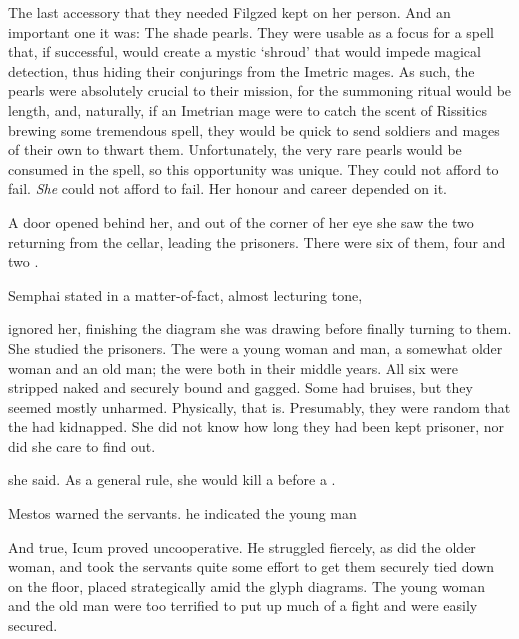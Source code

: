 The last accessory that they needed Filgzed kept on her person. And an important one it was: The shade pearls. They were usable as a focus for a spell that, if successful, would create a mystic `shroud' that would impede magical detection, thus hiding their conjurings from the Imetric mages. As such, the pearls were absolutely crucial to their mission, for the summoning ritual would be length, and, naturally, if an Imetrian mage were to catch the scent of Rissitics brewing some tremendous spell, they would be quick to send soldiers and mages of their own to thwart them. Unfortunately, the very rare pearls would be consumed in the spell, so this opportunity was unique. They could not afford to fail. \emph{She} could not afford to fail. Her honour and career depended on it. 

A door opened behind her, and out of the corner of her eye she saw the two \Gisshorn{} returning from the cellar, leading the prisoners. There were six of them, four \humans{} and two \scathae{}. 

 Semphai stated in a matter-of-fact, almost lecturing tone, 

\Filgzed{} ignored her, finishing the diagram she was drawing before finally turning to them. She studied the prisoners. The \humans{} were a young woman and man, a somewhat older woman and an old man; the \scathae{} were both \daxes{} in their middle years. All six were stripped naked and securely bound and gagged. Some had bruises, but they seemed mostly unharmed. Physically, that is. Presumably, they were random \Cicorans{} that the \Gisshorn{} had kidnapped. She did not know how long they had been kept prisoner, nor did she care to find out. 

 she said.  As a general rule, she would kill a \human{} before a \scatha{}.  

 Mestos warned the servants. \dash{}he indicated the young man\dash{} 

And true, Icum proved uncooperative. He struggled fiercely, as did the older woman, and took the servants quite some effort to get them securely tied down on the floor, placed strategically amid the glyph diagrams. The young woman and the old man were too terrified to put up much of a fight and were easily secured. 

